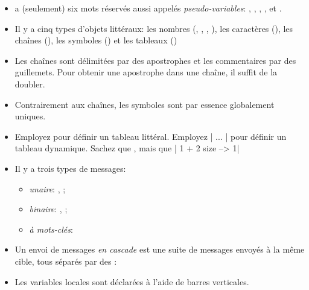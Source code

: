 \documentclass[a4paper,10pt,twoside]{book}
\begin{document}
\begin{itemize}

\item	\pharo a (seulement) six mots r\'{e}serv\'{e}s aussi appel\'{e}s
  \textit{pseudo-variables}: , , ,
  ,  et  .

\item	Il y a cinq types d'objets litt\'{e}raux: les nombres (,
  , \mbox{,} ), les caract\`{e}res
  (), %
les chaînes (), les symboles () et les tableaux ()

\item	Les chaînes sont d\'{e}limit\'{e}es par des apostrophes et les commentaires par des guillemets. Pour obtenir une apostrophe dans une chaîne, il suffit de la doubler.

\item	Contrairement aux chaînes, les symboles sont par essence globalement uniques.

\item	Employez  pour d\'{e}finir un tableau litt\'{e}ral.
		Employez \ct|{ ... }| pour d\'{e}finir un tableau dynamique.
		Sachez que
		, mais que 
		\ct|{ 1 + 2 } size --> 1|

\item	Il y a trois types de messages:
  \begin{itemize}
\item \emph{unaire}: \eg {}, ;
\item 		\emph{binaire}: \eg {}, ;
\item 		\emph{\`{a} mots-cl\'{e}s}: \eg {}%
      \end{itemize}
\item	Un envoi de messages \emph{en cascade}  est une suite de messages envoy\'{e}s \`{a} la m\^{e}me cible, tous s\'{e}par\'{e}s par des \ct{;}:

\item	Les variables locales sont d\'{e}clar\'{e}es à l'aide de barres verticales.
		 \ct{:=}  %


\end{itemize}
\end{document}
